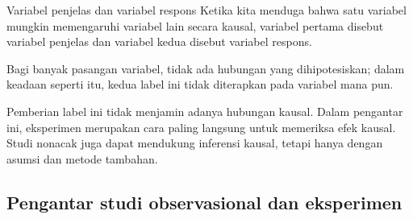 
\begin{onebox}{Variabel penjelas dan variabel respons}
Ketika kita menduga bahwa satu variabel mungkin memengaruhi variabel lain
secara kausal, variabel pertama disebut variabel penjelas dan variabel
kedua disebut variabel respons.
\vspace{1mm}

\hspace{10mm}

Bagi banyak pasangan variabel, tidak ada hubungan yang dihipotesiskan;
dalam keadaan seperti itu, kedua label ini tidak diterapkan pada
variabel mana pun.
\end{onebox}

Pemberian label ini tidak menjamin adanya hubungan kausal.
Dalam pengantar ini, eksperimen merupakan cara paling langsung untuk memeriksa
efek kausal. Studi nonacak juga dapat mendukung inferensi kausal, tetapi hanya
dengan asumsi dan metode tambahan.



\subsection{Pengantar studi observasional dan eksperimen}

